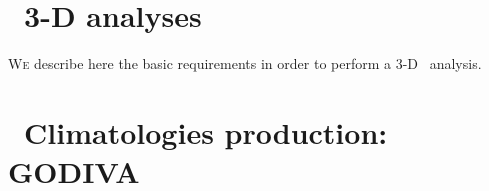 \chapter{\diva\ 3-D analyses\label{chap:diva3D}}

\lettrine[lines=2, loversize=-0.1, lraise=0.1]{W}{e} describe here the basic requirements in order to perform a 3-D \diva\, analysis.

\vspace{2cm}

\minitoc

\vspace{2cm}




\chapter{\diva\ Climatologies production: GODIVA \label{chap:divaclim}}






%

